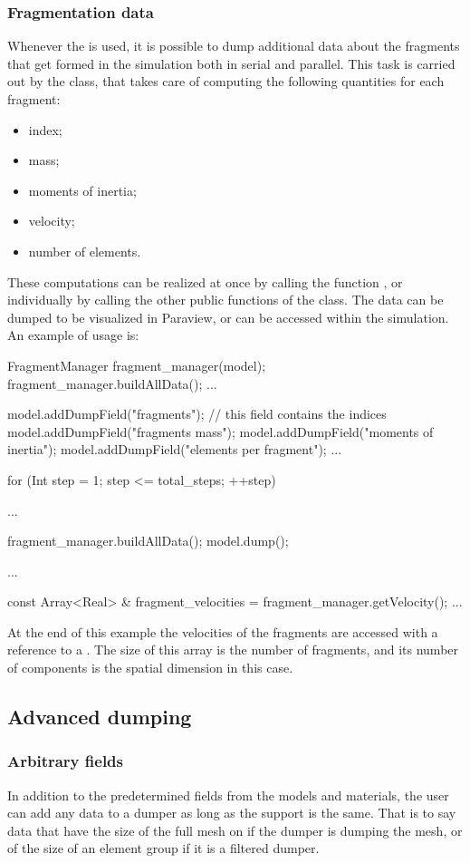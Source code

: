 \subsubsection{Fragmentation data}

Whenever the  is used, it is
possible to dump additional data about the fragments that get formed
in the simulation both in serial and parallel. This task is carried
out by the  class, that takes care of computing
the following quantities for each fragment:
\begin{itemize}
\item index;
\item mass;
\item moments of inertia;
\item velocity;
\item number of elements.
\end{itemize}
These computations can be realized at once by calling the function
, or individually by calling the other public
functions of the class. The data can be dumped to be visualized in
Paraview, or can be accessed within the simulation. An example of
usage is:
\begin{cpp}
  FragmentManager fragment_manager(model);
  fragment_manager.buildAllData();
  ...

  model.addDumpField("fragments");       // this field contains the indices
  model.addDumpField("fragments mass");
  model.addDumpField("moments of inertia");
  model.addDumpField("elements per fragment");
  ...

  for (Int step = 1; step <= total_steps; ++step) {
    ...

    fragment_manager.buildAllData();
    model.dump();
  }
  ...

  const Array<Real> & fragment_velocities = fragment_manager.getVelocity();
  ...
\end{cpp}
At the end of this example the velocities of the fragments are
accessed with a reference to a . The size of
this array is the number of fragments, and its number of components is
the spatial dimension in this case.


\subsection{Advanced dumping}

\subsubsection{Arbitrary fields}
In addition to the predetermined fields from the models and materials, the user
can add any data to a dumper as long as the support is the same. That is to say
data that have the size of the full mesh on if the dumper is dumping the mesh,
or of the size of an element group if it is a filtered dumper.

